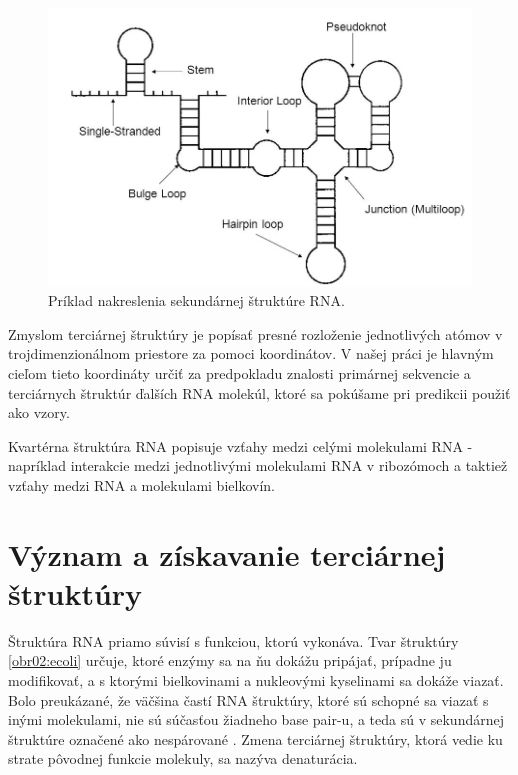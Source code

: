 \begin{figure}%
\includegraphics[width=\textwidth]{../img/secondary_structure}
\caption{Príklad nakreslenia sekundárnej štruktúre RNA. \cite{Eddy04}}
\label{obr01:secstru}
\end{figure}


\indent Zmyslom terciárnej štruktúry je popísať presné rozloženie jednotlivých atómov v trojdimenzionálnom priestore za pomoci koordinátov. V našej práci je hlavným cieľom tieto koordináty určiť za predpokladu znalosti primárnej sekvencie a terciárnych štruktúr ďalších RNA molekúl, ktoré sa pokúšame pri predikcii použiť ako vzory. 


\indent Kvartérna štruktúra RNA popisuje vzťahy medzi celými molekulami RNA - napríklad interakcie medzi jednotlivými molekulami RNA v ribozómoch \cite{Noller84} a taktiež vzťahy medzi RNA a molekulami bielkovín.

\section{Význam a získavanie terciárnej štruktúry}
Štruktúra RNA priamo súvisí s funkciou, ktorú vykonáva. Tvar štruktúry \ref{obr02:ecoli} určuje, ktoré enzýmy sa na ňu dokážu pripájať, prípadne ju modifikovať, a s ktorými bielkovinami a nukleovými kyselinami sa dokáže viazať. Bolo preukázané, že väčšina častí RNA štruktúry, ktoré sú schopné sa viazať s inými molekulami, nie sú súčasťou žiadneho base pair-u, a teda sú v sekundárnej štruktúre označené ako nespárované \cite{Schudoma10}. Zmena terciárnej štruktúry, ktorá vedie ku strate pôvodnej funkcie molekuly, sa nazýva denaturácia.

